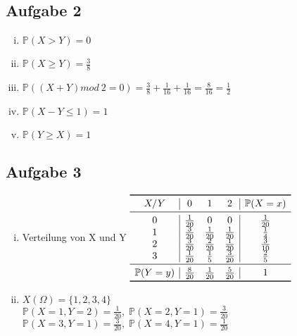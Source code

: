 \documentclass[10pt,a4paper,parskip=half]{scrartcl}
\begin{document}
\subsection*{Aufgabe 2}
\begin{enumerate}[(i)]
\item
$\mathbb{P}(X > Y) = 0$
\item
$\mathbb{P}(X \geq Y) = \frac{3}{8}$
\item
$\mathbb{P}((X + Y ) mod \: 2 = 0) = \frac{3}{8} + \frac{1}{16} + \frac{1}{16} = \frac{8}{16} = \frac{1}{2}$
\item
$\mathbb{P}(X - Y \leq 1) = 1$
\item
$\mathbb{P}(Y \geq X) = 1$
\end{enumerate}

\subsection*{Aufgabe 3}
\begin{enumerate}[(i)]
\item
Verteilung von X und Y
\begin{math}
\begin{array}{c | c c c | c}
\toprule
X/Y & 0 & 1 & 2 & \mathbb{P}(X=x) \\ 
\midrule
0 & \frac{1}{20} & 0 & 0 & \frac{1}{20} \\
1 & \frac{3}{20} & \frac{1}{20} & \frac{1}{20} & \frac{1}{4} \\
2 & \frac{3}{20} & \frac{2}{20} & \frac{1}{20} & \frac{3}{10} \\
3 & \frac{1}{20} & \frac{1}{5} & \frac{3}{20} & \frac{2}{5} \\
\midrule
\mathbb{P}(Y=y) & \frac{8}{20} & \frac{1}{20} & \frac{5}{20} & 1 \\
\bottomrule
\end{array}
\end{math}
\item
$X(\Omega) = \{1,2,3,4\}$ \\
$\mathbb{P}(X=1, Y=2) = \frac{1}{20}, \; \mathbb{P}(X=2, Y=1) = \frac{3}{20}$ \\
$\mathbb{P}(X=3, Y=1) = \frac{3}{20}, \; \mathbb{P}(X=4, Y=1) = \frac{1}{20}$
\end{enumerate}
\end{document}
